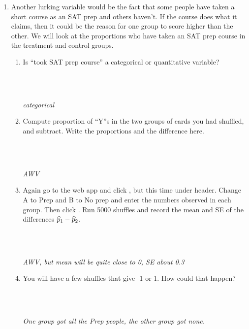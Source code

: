 \begin{enumerate}
\item Another lurking variable would be the fact that some people have
  taken a short course as an SAT prep and others haven't.  If the
  course does what it claims, then it could be the reason for one
  group to score higher than the other. We will look at the
  proportions who have taken an SAT prep course in the treatment and
  control groups.  
  \begin{enumerate}
  \item Is ``took SAT prep course'' a categorical or quantitative
    variable? 
\begin{students}
        \vspace{1cm}\\
\end{students}
\begin{key}
  \\ {\it categorical}
\end{key}

    \item Compute proportion of ``Y''s in the two groups of cards you
      had shuffled, and subtract.  Write the proportions and the
      difference here.
\begin{students}
        \vspace{1cm}\\
\end{students}
\begin{key}
  \\ {\it  AWV}
\end{key}

    \item Again go to the  web app and click , but
      this time under  header.  Change {\sf A}
      to {\sf Prep} and {\sf B} to {\sf No prep} and enter the
      numbers observed in each group.  Then click .  Run 5000 shuffles and record the mean and 
      SE of the differences $\widehat{p}_1 - \widehat{p}_2$.
\begin{students}
        \vspace{1cm}\\
\end{students}
\begin{key}
  \\ {\it AWV, but mean will be quite close to 0, SE about 0.3}
\end{key}
    \item You will have a few shuffles that give -1 or 1.  How could
      that happen? 
\begin{students}
        \vspace{1cm}\\
\end{students}
\begin{key}
  \\ {\it  One group got all the Prep people, the other group got none.}
\end{key}
 

\end{enumerate}
\end{enumerate}
